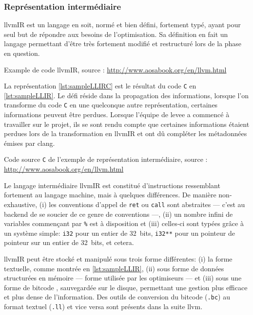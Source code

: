 \subsubsection{Représentation intermédiaire}

\gls{llvmIR} est un langage en soit, normé et bien défini, fortement typé, ayant pour seul but de répondre aux besoins de l'optimisation. Sa définition en fait un langage permettant d'être très fortement modifié et restructuré lors de la phase en question.

\begin{listing}
	\caption{Example de code \gls{llvmIR}, source : \url{http://www.aosabook.org/en/llvm.html}}
	\label{lst:sampleLLIR}
\end{listing}

La représentation \autoref{lst:sampleLLIRC} est le résultat du code \texttt{C} en \autoref{lst:sampleLLIR}. Le défi réside dans la propagation des informations, lorsque l'on transforme du code \texttt{C} en une quelconque autre représentation, certaines informations peuvent être perdues. Lorsque l'équipe de \gls{levee} a commencé à travailler sur le projet, ils se sont rendu compte que certaines informations étaient perdues lors de la transformation en \gls{llvmIR} et ont dû compléter les métadonnées émises par \gls{clang}.

\begin{listing}
	\caption{Code source \texttt{C} de l'exemple de représentation intermédiaire, source : \url{http://www.aosabook.org/en/llvm.html}}
	\label{lst:sampleLLIRC}
\end{listing}

Le langage intermédiaire \gls{llvmIR} est constitué d'instructions ressemblant fortement au langage machine, mais à quelques différences. De manière non-exhaustive, (i) les conventions d'appel de \texttt{ret} ou \texttt{call} sont abstraites --- c'est au \og backend \fg de se soucier de ce genre de conventions ---, (ii) un nombre infini de variables commençant par \texttt{\%} est à disposition et (iii) celles-ci sont typées grâce à un système simple: \texttt{i32} pour un entier de 32~bits, \texttt{i32**} pour un pointeur de pointeur sur un entier de 32~bits, et cetera.

\gls{llvmIR} peut être stocké et manipulé sous trois forme différentes: (i) la forme textuelle, comme montrée en \autoref{lst:sampleLLIR}, (ii) sous forme de données structurées en mémoire --- forme utilisée par les optimiseurs --- et (iii) sous une forme de \og bitcode \fg, sauvegardée sur le disque, permettant une gestion plus efficace et plus dense de l'information. Des outils de conversion du \og bitcode \fg (\texttt{.bc}) au format textuel (\texttt{.ll}) et vice versa sont présents dans la suite \gls{llvm}.

